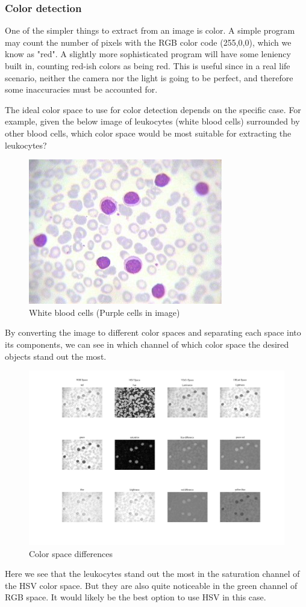 \subsubsection{Color detection}

One of the simpler things to extract from an image is color. A simple program may count the number of pixels with the RGB color code (255,0,0), which we know as "red". A slightly more sophisticated program will have some leniency built in, counting red-ish colors as being red. This is useful since in a real life scenario, neither the camera nor the light is going to be perfect, and therefore some inaccuracies must be accounted for. 

The ideal color space to use for color detection depends on the specific case. 
For example, given the below image of leukocytes (white blood cells) surrounded by other blood cells, which color space would be most suitable for extracting the leukocytes?
\begin{figure}[H]
	\centering
	\includegraphics[width=0.2\linewidth]{figure/Analysis/leukocytes.jpg}
	\caption{White blood cells (Purple cells in image)}
	\label{fig:leukocytes}
\end{figure}

By converting the image to different color spaces and separating each space into its components, we can see in which channel of which color space the desired objects stand out the most. 

\begin{figure}[H]
	\centering
	\includegraphics[width=\linewidth]{figure/Analysis/differences.jpg}
	\caption{Color space differences}
	\label{fig:differences}
\end{figure}
Here we see that the leukocytes stand out the most in the saturation channel of the HSV color space. But they are also quite noticeable in the green channel of RGB space. It would likely be the best option to use HSV in this case. 


